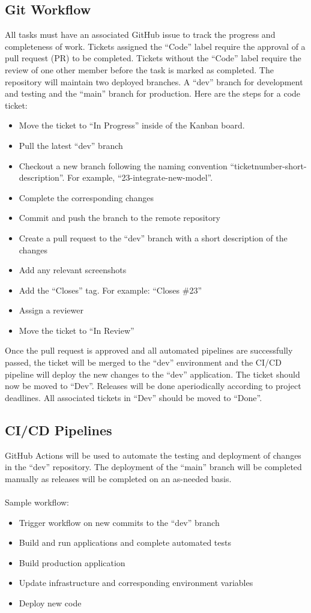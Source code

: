 \documentclass{article}
\begin{document}
\subsection{Git Workflow}
All tasks must have an associated GitHub issue to track the progress and completeness of
work. Tickets assigned the “Code” label require the approval of a pull request (PR) to be
completed. Tickets without the “Code” label require the review of one other member before the
task is marked as completed.
The repository will maintain two deployed branches. A “dev” branch for development and testing
and the “main” branch for production.
Here are the steps for a code ticket:
\begin{itemize}
\item Move the ticket to “In Progress” inside of the Kanban board.
\item Pull the latest “dev” branch
\item Checkout a new branch following the naming convention
“ticketnumber-short-description”. For example, “23-integrate-new-model”.
\item Complete the corresponding changes
\item Commit and push the branch to the remote repository
\item Create a pull request to the “dev” branch with a short description of the changes
\item Add any relevant screenshots
\item Add the “Closes” tag. For example: “Closes \#23”
\item Assign a reviewer
\item Move the ticket to “In Review”
\end{itemize}

Once the pull request is approved and all automated pipelines are successfully passed, the
ticket will be merged to the “dev” environment and the CI/CD pipeline will deploy the new
changes to the “dev” application. The ticket should now be moved to “Dev”.
Releases will be done aperiodically according to project deadlines. All associated tickets in
“Dev” should be moved to “Done”.
\subsection{CI/CD Pipelines}
GitHub Actions will be used to automate the testing and deployment of changes in the “dev”
repository. The deployment of the “main” branch will be completed manually as releases will be completed
on an as-needed basis.\\\\
Sample workflow:
\begin{itemize}
\item Trigger workflow on new commits to the “dev” branch
\item Build and run applications and complete automated tests
\item Build production application
\item Update infrastructure and corresponding environment variables
\item Deploy new code
\end{itemize}
\end{document}

